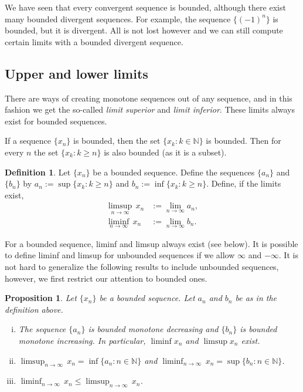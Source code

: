 \documentclass[12pt]{book}
\newcommand{\N}{{\mathbb{N}}}
\newcommand{\myindex}[1]{#1\index{#1}}
\theoremstyle{plain}
\newtheorem{prop}[thm]{Proposition}
\theoremstyle{remark}
\theoremstyle{definition}
\newtheorem{defn}[thm]{Definition}
\theoremstyle{exercise}
\theoremstyle{example}
\begin{document}
We have seen that every convergent sequence is bounded,
although there exist many bounded divergent sequences.  For example,
the sequence $\{ {(-1)}^n \}$ is bounded,
but it is divergent.  All is not lost however and we can
still compute certain limits with a bounded divergent sequence.

\subsection{Upper and lower limits}

There are ways of creating monotone sequences out of any sequence, and
in this fashion we
get the so-called \emph{\myindex{limit superior}} and
\emph{\myindex{limit inferior}}.  These limits always exist for bounded
sequences.

If a sequence $\{ x_n \}$ is bounded, then 
the set $\{ x_k : k \in \N \}$ is bounded.  Then for every $n$
the set $\{ x_k : k \geq n \}$ is also bounded (as it is a subset).

\begin{defn} \label{liminflimsup:def}
Let $\{ x_n \}$ be a bounded sequence.  Define the sequences $\{ a_n \}$
and $\{ b_n \}$ by
$a_n := \sup \{ x_k : k \geq n \}$ and
$b_n := \inf \{ x_k : k \geq n \}$.  
Define, if the limits exist,
\begin{align*}
\limsup_{n \to \infty} \, x_n & := \lim_{n \to \infty} a_n ,
\\
\liminf_{n \to \infty} \, x_n & := \lim_{n \to \infty} b_n .
\end{align*}
\end{defn}

For a bounded sequence, liminf and limsup always exist (see below).  It is possible
to define liminf and limsup for unbounded sequences if we allow $\infty$
and $-\infty$.  It is not hard to generalize the following results to
include unbounded sequences, however, we first restrict our attention to
bounded ones.

\begin{prop}
Let $\{ x_n \}$ be a bounded sequence.  Let $a_n$ and $b_n$ be as in
the definition above.
\begin{enumerate}[(i)]
\item
The
sequence $\{ a_n \}$ is bounded monotone decreasing
and $\{ b_n \}$ is bounded monotone increasing.  In particular,
$\liminf x_n$ and $\limsup x_n$ exist.
\item
$\displaystyle \limsup_{n \to \infty} \, x_n = \inf \{ a_n : n \in \N \}$
and
$\displaystyle \liminf_{n \to \infty} \, x_n = \sup \{ b_n : n \in \N \}$.
\item
$\displaystyle \liminf_{n \to \infty} \, x_n \leq
\limsup_{n \to \infty} \, x_n$.
\end{enumerate}
\end{prop}
\end{document}
